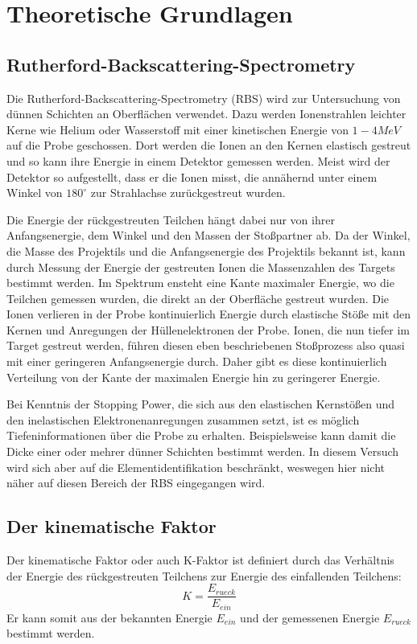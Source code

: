 \section{Theoretische Grundlagen}
\subsection{Rutherford-Backscattering-Spectrometry}
Die Rutherford-Backscattering-Spectrometry (RBS) wird zur Untersuchung von dünnen Schichten an Oberflächen verwendet. Dazu werden Ionenstrahlen leichter Kerne wie Helium oder Wasserstoff mit einer kinetischen Energie von $1-4MeV$ auf die Probe geschossen. Dort werden die Ionen an den Kernen elastisch gestreut und so kann ihre Energie in einem Detektor gemessen werden. Meist wird der Detektor so aufgestellt, dass er die Ionen misst, die annähernd unter einem Winkel von $180^\circ$ zur Strahlachse zurückgestreut wurden.

Die Energie der rückgestreuten Teilchen hängt dabei nur von ihrer Anfangsenergie, dem Winkel und den Massen der Stoßpartner ab. Da der Winkel, die Masse des Projektils und die Anfangsenergie des Projektils bekannt ist, kann durch Messung der Energie der gestreuten Ionen die Massenzahlen des Targets bestimmt werden. Im Spektrum ensteht eine Kante maximaler Energie, wo die Teilchen gemessen wurden, die direkt an der Oberfläche gestreut wurden. Die Ionen verlieren in der Probe kontinuierlich Energie durch elastische Stöße mit den Kernen und Anregungen der Hüllenelektronen der Probe. Ionen, die nun tiefer im Target gestreut werden, führen diesen eben beschriebenen Stoßprozess also quasi mit einer geringeren Anfangsenergie durch. Daher gibt es diese kontinuierlich Verteilung von der Kante der maximalen Energie hin zu geringerer Energie.

Bei Kenntnis der Stopping Power, die sich aus den elastischen Kernstößen und den inelastischen Elektronenanregungen zusammen setzt, ist es möglich Tiefeninformationen über die Probe zu erhalten. Beispielsweise kann damit die Dicke einer oder mehrer dünner Schichten bestimmt werden. In diesem Versuch wird sich aber auf die Elementidentifikation beschränkt, weswegen hier nicht näher auf diesen Bereich der RBS eingegangen wird.

\subsection{Der kinematische Faktor}
Der kinematische Faktor oder auch K-Faktor ist definiert durch das Verhältnis der Energie des rückgestreuten Teilchens zur Energie des einfallenden Teilchens:
\begin{equation}
 K = \frac{E_{rueck}}{E_{ein}}
\end{equation}
Er kann somit aus der bekannten Energie $E_{ein}$ und der gemessenen Energie $E_{rueck}$ bestimmt werden. 

